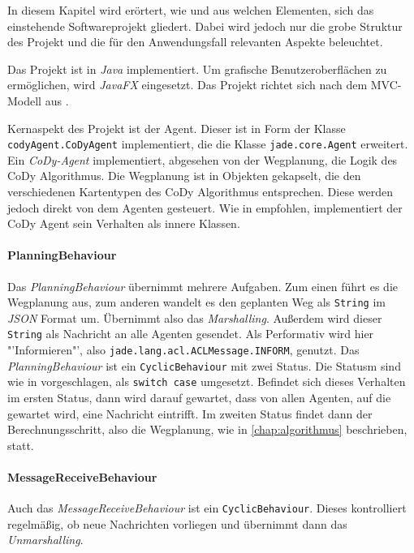 In diesem Kapitel wird erörtert, wie und aus welchen Elementen, sich das einstehende Softwareprojekt gliedert. Dabei wird jedoch nur die grobe Struktur des Projekt und die für den Anwendungsfall relevanten Aspekte beleuchtet.

Das Projekt ist in \textit{Java} implementiert. Um grafische Benutzeroberflächen zu ermöglichen, wird \textit{JavaFX} eingesetzt. Das Projekt richtet sich nach dem MVC-Modell aus \cite{web:mvc}.

\begin{sloppypar}
Kernaspekt des Projekt ist der Agent. Dieser ist in Form der Klasse \texttt{codyAgent.CoDyAgent} implementiert, die die Klasse \texttt{jade.core.Agent} erweitert. Ein \textit{CoDy-Agent} implementiert, abgesehen von der Wegplanung, die Logik des CoDy Algorithmus. Die Wegplanung ist in Objekten gekapselt, die den verschiedenen Kartentypen des CoDy Algorithmus entsprechen. Diese werden jedoch direkt von dem Agenten gesteuert. Wie in \cite{book:jade} empfohlen, implementiert der CoDy Agent sein Verhalten als innere Klassen.

\paragraph{PlanningBehaviour}
Das \textit{PlanningBehaviour} übernimmt mehrere Aufgaben. Zum einen führt es die Wegplanung aus, zum anderen wandelt es den geplanten Weg als \texttt{String} im \textit{JSON} Format um. Übernimmt also das \textit{Marshalling}. Außerdem wird dieser \texttt{String} als Nachricht an alle Agenten gesendet. Als Performativ wird hier "'Informieren"', also \texttt{jade.lang.acl.ACLMessage.INFORM}, genutzt. Das \textit{PlanningBehaviour} ist ein \texttt{CyclicBehaviour} mit zwei Status. Die Statusm sind wie in \cite{book:jade} vorgeschlagen, als \texttt{switch case} umgesetzt. Befindet sich dieses Verhalten im ersten Status, dann wird darauf gewartet, dass von allen Agenten, auf die gewartet wird, eine Nachricht eintrifft. Im zweiten Status findet dann der Berechnungsschritt, also die Wegplanung, wie in \ref{chap:algorithmus} beschrieben, statt.
\end{sloppypar}

\paragraph{MessageReceiveBehaviour}
Auch das \textit{MessageReceiveBehaviour} ist ein \texttt{CyclicBehaviour}. Dieses kontrolliert regelmäßig, ob neue Nachrichten vorliegen und übernimmt dann das \textit{Unmarshalling}.

